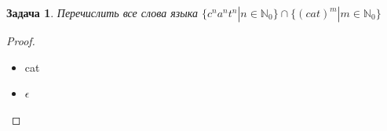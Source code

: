\documentclass{article}
\newtheorem{problem}{Задача}
\begin{document}
    \begin{problem}
        Перечислить все слова языка $\{c^na^nt^n | n \in \mathbb{N}_0 \} \cap \{(cat)^m | m \in \mathbb{N}_0\}$
    \end{problem}
    \begin{proof}
        $ $
        \begin{itemize}
            \item cat
            \item $\epsilon$
        \end{itemize}
    \end{proof}
\end{document}
